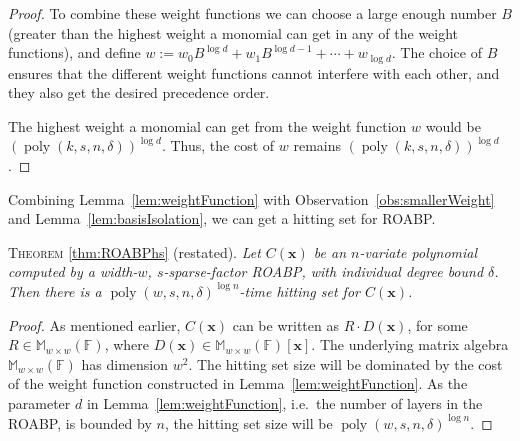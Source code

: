 \documentclass[final,oneeqnum, onethmnum, onefignum]{siamltex1213}
\newcommand{\Mat}{\mathbb M}
\newcommand{\F}{\mathbb F}
\newcommand{\degree}{\delta} %
\DeclareMathOperator{\poly}{poly}
\newcommand{\x}{\mathbf{x}}
\newenvironment{reptheorem}[1]{T\textsc{heorem} \ref{#1} (restated).\em}{}
\begin{document}
\begin{proof}
To combine these weight functions we can choose a large enough number $B$ 
(greater than the highest weight a monomial can get in any of the weight functions),
and define $w := w_0 B^{\log d} + w_1 B^{\log d -1} + \dotsm + w_{\log d}$. 
The choice of $B$ ensures that the different weight functions cannot interfere with each 
other, and they also get the desired precedence order. 

The highest weight a monomial can get from the weight function $w$ 
would be $(\poly(k, s, n, \degree))^{\log d}$. Thus, the cost of $w$
remains $(\poly(k, s, n, \degree))^{\log d}$.

\end{proof}

Combining Lemma~\ref{lem:weightFunction} with 
 Observation~\ref{obs:smallerWeight} and Lemma~\ref{lem:basisIsolation}, 
we can get a hitting set for ROABP.

\begin{reptheorem}{thm:ROABPhs}
Let $C(\x)$ be an $n$-variate polynomial computed by a width-$w$, $s$-sparse-factor
ROABP, with individual degree bound $\degree$. Then there is a $\poly(w, s, n, \degree)^{\log n}$-time
hitting set for $C(\x)$.
\end{reptheorem}
\begin{proof}
As mentioned earlier, $C(\x)$ can be written as $R \cdot D(\x)$,
for some $R \in \Mat_{w \times w}(\F)$, where $D(\x) \in \Mat_{w \times w}(\F)[\x]$.
The underlying matrix algebra $\Mat_{w \times w}(\F)$ has dimension $w^2$.
The hitting set size will be dominated by the cost of 
the weight function constructed in Lemma~\ref{lem:weightFunction}.
As the parameter $d$ in Lemma~\ref{lem:weightFunction}, i.e.\ the number of layers in
the ROABP, is bounded by $n$,
the hitting set size will be $\poly(w, s, n, \degree)^{\log n}$.
\end{proof}

\end{document}
